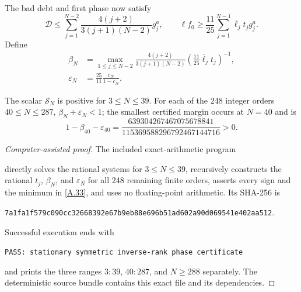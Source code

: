 The bad debt and first phase now satisfy
\[
 \mathcal D\le\sum_{j=1}^{N-2}
 {\frac{4(j+2)}{3(j+1)(N-2)}}g_j^a,\qquad
 \ell f_0\ge{\frac{11}{25}}\sum_{j=1}^{N-1}
 \overline\ell_jt_jg_j^a.                                \tag{A.31}\label{A.31}
\]
Define
\[
\begin{aligned}
 \beta_N&=\max_{1\le j\le N-2}
 {\frac{4(j+2)}{3(j+1)(N-2)}}
 \left({\frac{11}{25}}\overline\ell_jt_j\right)^{-1},\\
 \varepsilon_N&={\frac{25}{11}}{\frac{c_N}{1-c_N}}.
\end{aligned}                                              \tag{A.32}\label{A.32}
\]
\begin{lemma}
\label{lem:symmetric-finite}
The scalar $\mathcal S_N$ is positive for $3\le N\le39$.  For each of the
248 integer orders $40\le N\le287$,
$\beta_N+\varepsilon_N<1$; the smallest certified margin occurs at $N=40$
and is
\[
1-\beta_{40}-\varepsilon_{40}
={\frac{639304267467075678841}{115369588296792467144716}}>0.  \tag{A.33}\label{A.33}
\]
\end{lemma}

\begin{proof}[Computer-assisted proof]
The included exact-arithmetic program
\begin{center}
\small{}
\end{center}
directly solves the rational systems for $3\le N\le39$, recursively constructs the rational
$t_j$, $\beta_N$, and $\varepsilon_N$ for all 248 remaining finite orders,
asserts every sign and the minimum in \eqref{A.33}, and uses no floating-point
arithmetic.  Its SHA-256 is
\begin{center}
\small\nolinkurl{7a1fa1f579c090cc32668392e67b9eb88e696b51ad602a90d069541e402aa512}.
\end{center}
Successful execution ends with
\begin{center}
\small\texttt{PASS: stationary symmetric inverse-rank phase certificate}
\end{center}
and prints
the three ranges $3\!:\!39$, $40\!:\!287$, and $N\ge288$ separately.  The
deterministic source bundle contains this exact file and its dependencies.
\end{proof}

